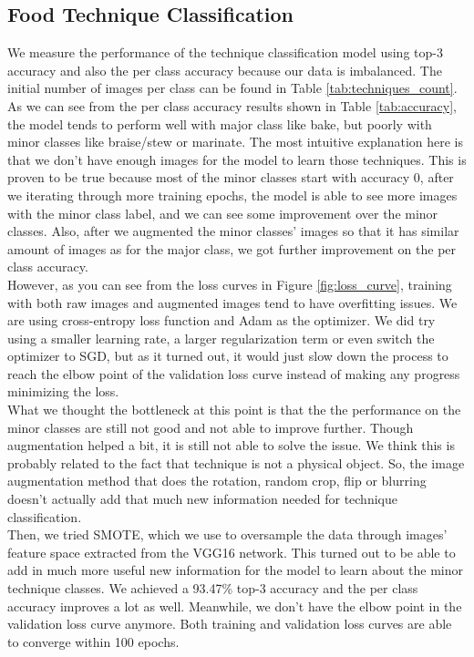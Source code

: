 \documentclass[10pt,twocolumn,letterpaper]{article}
\begin{document}
\subsection{Food Technique Classification}
We measure the performance of the technique classification model using top-3 accuracy and also the per class accuracy because our data is imbalanced. The initial number of images per class can be found in Table \ref{tab:techniques_count}. As we can see from the per class accuracy results shown in Table \ref{tab:accuracy}, the model tends to perform well with major class like bake, but poorly with minor classes like braise/stew or marinate. The most intuitive explanation here is that we don’t have enough images for the model to learn those techniques. This is proven to be true because most of the minor classes start with accuracy 0, after we iterating through more training epochs, the model is able to see more images with the minor class label, and we can see some improvement over the minor classes. Also, after we augmented the minor classes’ images so that it has similar amount of images as for the major class, we got further improvement on the per class accuracy. \\
However, as you can see from the loss curves in Figure  \ref{fig:loss_curve}, training with both raw images and augmented images tend to have overfitting issues. We are using cross-entropy loss function and Adam as the optimizer. We did try using a smaller learning rate, a larger regularization term or even switch the optimizer to SGD, but as it turned out, it would just slow down the process to reach the elbow point of the validation loss curve instead of making any progress minimizing the loss. \\
What we thought the bottleneck at this point is that the the performance on the minor classes are still not good and not able to improve further. Though augmentation helped a bit, it is still not able to solve the issue. We think this is probably related to the fact that technique is not a physical object. So, the image augmentation method that does the rotation, random crop, flip or blurring doesn’t actually add that much new information needed for technique classification. \\
Then, we tried SMOTE, which we use to oversample the data through images’ feature space extracted from the VGG16 network. This turned out to be able to add in much more useful new information for the model to learn about the minor technique classes. We achieved a 93.47\% top-3 accuracy and the per class accuracy improves a lot as well. Meanwhile, we don’t have the elbow point in the validation loss curve anymore. Both training and validation loss curves are able to converge within 100 epochs.
\end{document}
